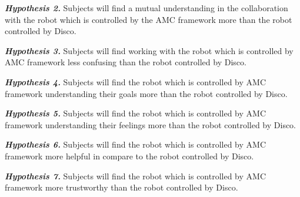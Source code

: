 \documentclass{sig-alternate-05-2015}
\begin{document}
\textit{\textbf{Hypothesis 2.}} Subjects will find a mutual understanding in the
collaboration with the robot which is controlled by the AMC framework more than
the robot controlled by Disco.

\textit{\textbf{Hypothesis 3.}} Subjects will find working with the robot which
is controlled by AMC framework less confusing than the robot controlled by
Disco.

\textit{\textbf{Hypothesis 4.}} Subjects will find the robot which is controlled
by AMC framework understanding their goals more than the robot controlled by
Disco.

\textit{\textbf{Hypothesis 5.}} Subjects will find the robot which is controlled
by AMC framework understanding their feelings more than the robot controlled by
Disco.

\textit{\textbf{Hypothesis 6.}} Subjects will find the robot which is controlled
by AMC framework more helpful in compare to the robot controlled by Disco.

\textit{\textbf{Hypothesis 7.}} Subjects will find the robot which is controlled
by AMC framework more trustworthy than the robot controlled by Disco.
\end{document}
